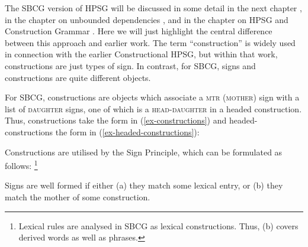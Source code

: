 \documentclass[output=paper
	        ,collection
	        ,collectionchapter
 	        ,biblatex
                ,babelshorthands
                ,newtxmath
                ,draftmode
                ,colorlinks, citecolor=brown
]{langscibook}
\begin{document}
The SBCG version of HPSG will be discussed in some detail in the next chapter
\citep*[\page~]{chapters/evolution}, in the chapter on
unbounded dependencies \citep[Section~\ref{udc:sec-SBCG}]{chapters/udc}, and in the chapter on HPSG and
Construction Grammar \citep[Section~\ref{cxg:sec-sbcg}]{chapters/cxg}. Here we will just highlight
the central difference between this approach and earlier work. The term ``construction'' is widely
used in connection with the earlier Constructional HPSG, but within that work, constructions are
just types of sign. In contrast, for SBCG, signs and constructions are quite different objects. 

For SBCG, constructions are objects which associate a \textsc{mtr} (\textsc{mother}) sign with a
list of \textsc{daughter} signs, one of which is a \textsc{head-daughter} in a headed
construction. Thus, constructions take the form in (\ref{ex-constructions}) and headed-constructions
the form in (\ref{ex-headed-constructions}): 

\eal\label{ex:prop48}
\ex\label{ex:prop48a}\label{ex-constructions}
	
	
\ex\label{ex:prop48b}\label{ex-headed-constructions}
\zl

\noindent
Constructions are utilised by the Sign Principle, which can be formulated as follows:%
%
\footnote{Lexical rules are analysed in SBCG as lexical constructions. Thus, (b) covers derived words as well as phrases.}
%

\eanoraggedright
\label{ex:prop49}
Signs are well formed if either (a) they match some lexical entry, or (b) they match the mother of some construction.
\z
\end{document}
